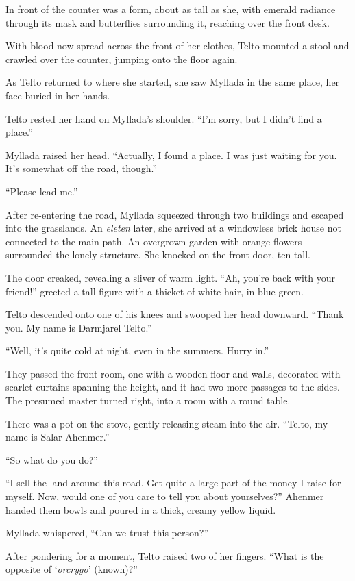 In front of the counter was a form, about as tall as she, with emerald radiance through its mask and butterflies surrounding it, reaching over the front desk.

With blood now spread across the front of her clothes, Telto mounted a stool and crawled over the counter, jumping onto the floor again.

\centeredstars

As Telto returned to where she started, she saw Myllada in the same place, her face buried in her hands.

Telto rested her hand on Myllada's shoulder. ``I'm sorry, but I didn't find a place.''

Myllada raised her head. ``Actually, I found a place. I was just waiting for you. It's somewhat off the road, though.''

``Please lead me.''

After re-entering the road, Myllada squeezed through two buildings and escaped into the grasslands. An \emph{eleten} later, she arrived at a windowless brick house not connected to the main path. An overgrown garden with orange flowers surrounded the lonely structure. She knocked on the front door, ten \reasyr{} tall.

The door creaked, revealing a sliver of warm light. ``Ah, you're back with your friend!'' greeted a tall figure with a thicket of white hair, in blue-green.

Telto descended onto one of his knees and swooped her head downward. ``Thank you. My name is Darmjarel Telto.''

``Well, it's quite cold at night, even in the summers. Hurry in.''

They passed the front room, one with a wooden floor and walls, decorated with scarlet curtains spanning the height, and it had two more passages to the sides. The presumed master turned right, into a room with a round table.

There was a pot on the stove, gently releasing steam into the air. ``Telto, my name is Salar Ahenmer.''

``So what do you do?''

``I sell the land around this road. Get quite a large part of the money I raise for myself. Now, would one of you care to tell you about yourselves?'' Ahenmer handed them bowls and poured in a thick, creamy yellow liquid.

Myllada whispered, ``Can we trust this person?''

After pondering for a moment, Telto raised two of her fingers. ``What is the opposite of `\emph{orcrygo}' (known)?''

